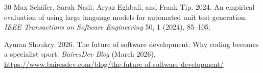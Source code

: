 \documentclass[sigconf,nonacm]{acmart}
\begin{document}
\begin{thebibliography}{30}
Max Schäfer, Sarah Nadi, Aryaz Eghbali, and Frank Tip. 2024.
An empirical evaluation of using large language models for automated unit test generation.
\textit{IEEE Transactions on Software Engineering} 50, 1 (2024), 85--105.

Ayman Shoukry. 2026.
The future of software development: Why coding becomes a specialist sport.
\textit{BairesDev Blog} (March 2026).
\url{https://www.bairesdev.com/blog/the-future-of-software-development/}

\end{thebibliography}
\end{document}
